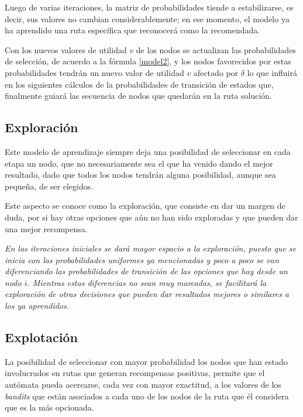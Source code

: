 
Luego de varias iteraciones, la matriz de probabilidades tiende a estabilizarse, es decir, sus valores no cambian considerablemente; en ese momento, el modelo ya ha aprendido una ruta específica que reconocerá como la recomendada.

Con los nuevos valores de utilidad $v$ de los nodos se actualizan las probabilidades de selección, de acuerdo a la fórmula \ref{model2}, y los nodos favorecidos por estas probabilidades tendrán un nuevo valor de utilidad $v$ afectado por $\delta$ lo que influirá en los siguientes cálculos de la probabilidades de transición de estados que, finalmente guiará las secuencia de nodos que quedarán en la ruta solución.


\subsection{Exploración}
Este modelo de aprendizaje siempre deja una posibilidad de seleccionar en cada etapa un nodo, que no necesariamente sea el que ha venido dando el mejor resultado, dado que todos los nodos tendrán alguna posibilidad, aunque sea pequeña, de ser elegidos.

Este aspecto se conoce como la exploración, que consiste en dar un margen de duda, por si hay otras opciones que aún no han sido exploradas y que pueden dar una mejor recompensa.

\textit{En las iteraciones iniciales se dará mayor espacio a la exploración, puesto que se inicia con las probabilidades uniformes ya mencionadas y poco a poco se van diferenciando las probabilidades de transición de las opciones que hay desde un nodo $i$. Mientras estas diferencias no sean muy marcadas, se facilitará la exploración de otras decisiones que pueden dar resultados mejores o similares a los ya aprendidos.}

\subsection{Explotación}
La posibilidad de seleccionar con mayor probabilidad los nodos que han estado involucrados en rutas que generan recompensas positivas, permite que el autómata pueda acercarse, cada vez con mayor exactitud, a los valores de los \textit{bandits} que están asociados a cada uno de los nodos de la ruta que él considera que es la más opcionada.

